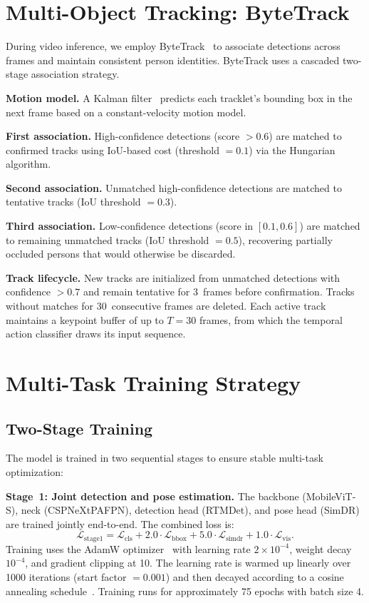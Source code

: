 \section{Multi-Object Tracking: ByteTrack}
\label{sec:tracking}

During video inference, we employ ByteTrack~\cite{zhang2022bytetrack} to associate detections across frames and maintain consistent person identities. ByteTrack uses a cascaded two-stage association strategy.

\textbf{Motion model.} A Kalman filter~\cite{bewley2016simple} predicts each tracklet's bounding box in the next frame based on a constant-velocity motion model.

\textbf{First association.} High-confidence detections (score $> 0.6$) are matched to confirmed tracks using IoU-based cost (threshold $= 0.1$) via the Hungarian algorithm.

\textbf{Second association.} Unmatched high-confidence detections are matched to tentative tracks (IoU threshold $= 0.3$).

\textbf{Third association.} Low-confidence detections (score in $[0.1, 0.6]$) are matched to remaining unmatched tracks (IoU threshold $= 0.5$), recovering partially occluded persons that would otherwise be discarded.

\textbf{Track lifecycle.} New tracks are initialized from unmatched detections with confidence $> 0.7$ and remain tentative for 3~frames before confirmation. Tracks without matches for 30~consecutive frames are deleted. Each active track maintains a keypoint buffer of up to $T = 30$ frames, from which the temporal action classifier draws its input sequence.

\section{Multi-Task Training Strategy}
\label{sec:training}

\subsection{Two-Stage Training}
\label{subsec:two_stage}

The model is trained in two sequential stages to ensure stable multi-task optimization:

\textbf{Stage~1: Joint detection and pose estimation.} The backbone (MobileViT-S), neck (CSPNeXtPAFPN), detection head (RTMDet), and pose head (SimDR) are trained jointly end-to-end. The combined loss is:
\begin{equation}
    \mathcal{L}_\text{stage1} = \mathcal{L}_\text{cls} + 2.0 \cdot \mathcal{L}_\text{bbox} + 5.0 \cdot \mathcal{L}_\text{simdr} + 1.0 \cdot \mathcal{L}_\text{vis}.
    \label{eq:stage1_loss}
\end{equation}
Training uses the AdamW optimizer~\cite{loshchilov2019decoupled} with learning rate $2 \times 10^{-4}$, weight decay $10^{-4}$, and gradient clipping at 10. The learning rate is warmed up linearly over 1000 iterations (start factor $= 0.001$) and then decayed according to a cosine annealing schedule~\cite{loshchilov2017sgdr}. Training runs for approximately 75 epochs with batch size 4.

